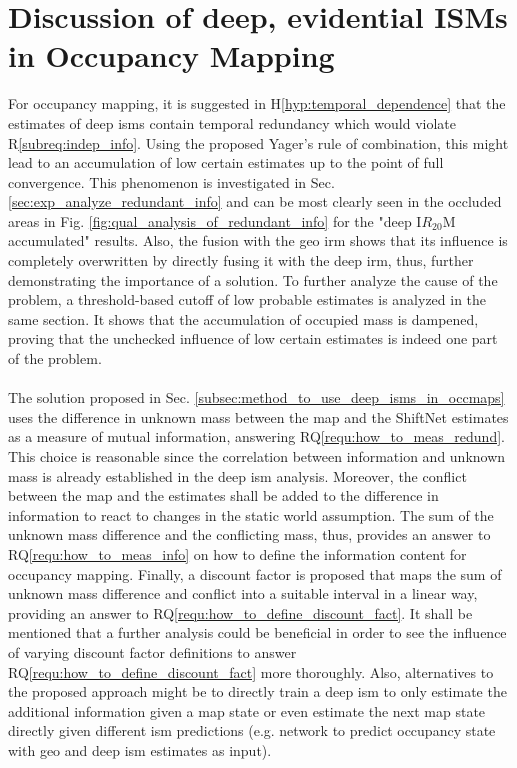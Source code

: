 \section{Discussion of deep, evidential ISMs in Occupancy Mapping}
\label{sec:disc_deep_ev_isms_in_occ_maps}
For occupancy mapping, it is suggested in H\ref{hyp:temporal_dependence} that the estimates of deep \gls{ism}s contain temporal redundancy which would violate R\ref{subreq:indep_info}. Using the proposed Yager's rule of combination, this might lead to an accumulation of low certain estimates up to the point of full convergence. This phenomenon is investigated in Sec. \ref{sec:exp_analyze_redundant_info} and can be most clearly seen in the occluded areas in Fig. \ref{fig:qual_analysis_of_redundant_info} for the "deep I$R_{20}$M accumulated" results. Also, the fusion with the geo \gls{irm} shows that its influence is completely overwritten by directly fusing it with the deep \gls{irm}, thus, further demonstrating the importance of a solution. To further analyze the cause of the problem, a threshold-based cutoff of low probable estimates is analyzed in the same section. It shows that the accumulation of occupied mass is dampened, proving that the unchecked influence of low certain estimates is indeed one part of the problem.
\\\\
The solution proposed in Sec. \ref{subsec:method_to_use_deep_isms_in_occmaps} uses the difference in unknown mass between the map and the ShiftNet estimates as a measure of mutual information, answering RQ\ref{requ:how_to_meas_redund}. This choice is reasonable since the correlation between information and unknown mass is already established in the deep \gls{ism} analysis. Moreover, the conflict between the map and the estimates shall be added to the difference in information to react to changes in the static world assumption. The sum of the unknown mass difference and the conflicting mass, thus, provides an answer to RQ\ref{requ:how_to_meas_info} on how to define the information content for occupancy mapping. Finally, a discount factor is proposed that maps the sum of unknown mass difference and conflict into a suitable interval in a linear way, providing an answer to RQ\ref{requ:how_to_define_discount_fact}. It shall be mentioned that a further analysis could be beneficial in order to see the influence of varying discount factor definitions to answer RQ\ref{requ:how_to_define_discount_fact} more thoroughly. Also, alternatives to the proposed approach might be to directly train a deep \gls{ism} to only estimate the additional information given a map state or even estimate the next map state directly given different \gls{ism} predictions (e.g. network to predict occupancy state with geo and deep \gls{ism} estimates as input).
